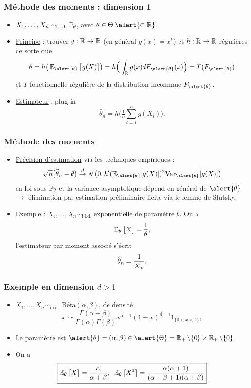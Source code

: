 \begin{frame}
\frametitle{Méthode des moments : dimension 1}
\begin{itemize}
\item $X_1,\ldots, X_n \sim_{\text{i.i.d.}} \operatorname{{\mathbb P}}_\theta$, avec $\theta \in \Theta \;\alert{ \subset \R}$.
\item \underline{Principe} : trouver $g:\operatorname{{\mathbb R}}\rightarrow \operatorname{{\mathbb R}}$ (en général $g(x)=x^k$) et $h:\operatorname{{\mathbb R}}\rightarrow \operatorname{{\mathbb R}}$ \alert{ régulières} de sorte que
$$\theta  = h\big(\E_{\alert{\theta}}\big[g(X)\big]\big) = h\Big(\int_{\R}g(x)dF_{\alert{\theta}}(x)\Big)=T(F_{\alert{\theta}})$$
et $T$ fonctionnelle régulière de la distribution inconnnue $F_{\alert{\theta}}$.
\item \underline{Estimateur} :  plug-in
$$\widehat \theta_n = h\big(\tfrac{1}{n}\sum_{i = 1}^n g(X_i)\big).$$
\end{itemize}
\end{frame}

\begin{frame}
\frametitle{Méthode des moments}
\begin{itemize}
\item \underline{Précision d'estimation} via les techniques empiriques :
$$\sqrt{n}\big(\widehat \theta_n - \theta\big) \stackrel{d}{\rightarrow} {\mathcal N}\big(0, h'(\E_{\alert{\theta}}[g(X)])^2\mathrm{Var}_{\alert{ \theta}}[g(X)]\big)$$
en \alert{ loi sous $\operatorname{{\mathbb P}}_\theta$} et la variance asymptotique dépend en général de $\alert{\theta}$ $\rightarrow$ élimination par estimation préliminaire licite via le lemme de Slutsky.
\item \underline{Exemple} : $X_1,\ldots, X_n\sim_{\text{i.i.d.}}$ exponentielle de paramètre $\theta$. On a
$$\operatorname{{\mathbb E}}_\theta\big[X\big] = \frac{1}{\theta},$$
l'estimateur par moment associé s'écrit
$$\operatorname{\widehat \theta_{\mathnormal{n}}} = \frac{1}{\overline{X}_n}.$$
\end{itemize}
\end{frame}

\begin{frame}
\frametitle{Exemple en dimension $d>1$}
\begin{itemize}
\item $X_1,\ldots,X_n \sim_{\text{i.i.d.}}$ Béta$(\alpha,\beta)$, de densité
$$x \leadsto \frac{\Gamma(\alpha+\beta)}{\Gamma(\alpha)\Gamma(\beta)}x^{\alpha-1}(1-x)^{\beta-1}1_{\{0 < x < 1\}},$$
\item Le paramètre est $\alert{\theta} = (\alpha,\beta) \in \alert{\Theta}=\R_+\setminus\{0\} \times \R_+\setminus\{0\}$.
\item On a
$$\boxed{\operatorname{{\mathbb E}}_\theta\big[X\big]=\frac{\alpha}{\alpha+\beta},\;\;\operatorname{{\mathbb E}}_\theta\big[X^2\big]=\frac{\alpha(\alpha+1)}{(\alpha+\beta+1)(\alpha+\beta)}}$$
\end{itemize}
\end{frame}

